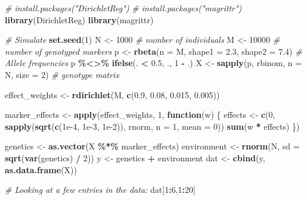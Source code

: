 \documentclass[
]{article}
\newenvironment{Shaded}{\begin{snugshade}}{\end{snugshade}}
\newcommand{\AttributeTok}[1]{\textcolor[rgb]{0.13,0.29,0.53}{#1}}
\newcommand{\CommentTok}[1]{\textcolor[rgb]{0.56,0.35,0.01}{\textit{#1}}}
\newcommand{\ControlFlowTok}[1]{\textcolor[rgb]{0.13,0.29,0.53}{\textbf{#1}}}
\newcommand{\DecValTok}[1]{\textcolor[rgb]{0.00,0.00,0.81}{#1}}
\newcommand{\FloatTok}[1]{\textcolor[rgb]{0.00,0.00,0.81}{#1}}
\newcommand{\FunctionTok}[1]{\textcolor[rgb]{0.13,0.29,0.53}{\textbf{#1}}}
\newcommand{\NormalTok}[1]{#1}
\newcommand{\OtherTok}[1]{\textcolor[rgb]{0.56,0.35,0.01}{#1}}
\newcommand{\SpecialCharTok}[1]{\textcolor[rgb]{0.81,0.36,0.00}{\textbf{#1}}}
\begin{document}
\begin{Shaded}
\begin{Highlighting}[]
\CommentTok{\# install.packages("DirichletReg")}
\CommentTok{\# install.packages("magrittr")}
\FunctionTok{library}\NormalTok{(DirichletReg)}
\FunctionTok{library}\NormalTok{(magrittr)}

\CommentTok{\# Simulate }
\FunctionTok{set.seed}\NormalTok{(}\DecValTok{1}\NormalTok{)}
\NormalTok{N }\OtherTok{\textless{}{-}} \DecValTok{1000} \CommentTok{\# number of individuals}
\NormalTok{M }\OtherTok{\textless{}{-}} \DecValTok{10000} \CommentTok{\# number of genotyped markers}
\NormalTok{p }\OtherTok{\textless{}{-}} \FunctionTok{rbeta}\NormalTok{(}\AttributeTok{n =}\NormalTok{ M, }\AttributeTok{shape1 =} \FloatTok{2.3}\NormalTok{, }\AttributeTok{shape2 =} \FloatTok{7.4}\NormalTok{) }\CommentTok{\# Allele frequencies}
\NormalTok{p }\SpecialCharTok{\%\textless{}\textgreater{}\%} \FunctionTok{ifelse}\NormalTok{(. }\SpecialCharTok{\textless{}} \FloatTok{0.5}\NormalTok{, ., }\DecValTok{1} \SpecialCharTok{{-}}\NormalTok{ .)}
\NormalTok{X }\OtherTok{\textless{}{-}} \FunctionTok{sapply}\NormalTok{(p, rbinom, }\AttributeTok{n =}\NormalTok{ N, }\AttributeTok{size =} \DecValTok{2}\NormalTok{) }\CommentTok{\# genotype matrix}

\NormalTok{effect\_weights }\OtherTok{\textless{}{-}} \FunctionTok{rdirichlet}\NormalTok{(M, }\FunctionTok{c}\NormalTok{(}\FloatTok{0.9}\NormalTok{, }\FloatTok{0.08}\NormalTok{, }\FloatTok{0.015}\NormalTok{, }\FloatTok{0.005}\NormalTok{))}

\NormalTok{marker\_effects }\OtherTok{\textless{}{-}} \FunctionTok{apply}\NormalTok{(effect\_weights, }\DecValTok{1}\NormalTok{, }\ControlFlowTok{function}\NormalTok{(w) \{}
\NormalTok{  effects }\OtherTok{\textless{}{-}} \FunctionTok{c}\NormalTok{(}\DecValTok{0}\NormalTok{, }\FunctionTok{sapply}\NormalTok{(}\FunctionTok{sqrt}\NormalTok{(}\FunctionTok{c}\NormalTok{(}\FloatTok{1e{-}4}\NormalTok{, }\FloatTok{1e{-}3}\NormalTok{, }\FloatTok{1e{-}2}\NormalTok{)), rnorm, }\AttributeTok{n =} \DecValTok{1}\NormalTok{, }\AttributeTok{mean =} \DecValTok{0}\NormalTok{))}
  \FunctionTok{sum}\NormalTok{(w }\SpecialCharTok{*}\NormalTok{ effects)}
\NormalTok{\})}

\NormalTok{genetics }\OtherTok{\textless{}{-}} \FunctionTok{as.vector}\NormalTok{(X }\SpecialCharTok{\%*\%}\NormalTok{ marker\_effects)}
\NormalTok{environment }\OtherTok{\textless{}{-}} \FunctionTok{rnorm}\NormalTok{(N, }\AttributeTok{sd =} \FunctionTok{sqrt}\NormalTok{(}\FunctionTok{var}\NormalTok{(genetics) }\SpecialCharTok{/} \DecValTok{2}\NormalTok{))}
\NormalTok{y }\OtherTok{\textless{}{-}}\NormalTok{ genetics }\SpecialCharTok{+}\NormalTok{ environment}
\NormalTok{dat }\OtherTok{\textless{}{-}} \FunctionTok{cbind}\NormalTok{(y, }\FunctionTok{as.data.frame}\NormalTok{(X))}

\CommentTok{\# Looking at a few entries in the data:}
\NormalTok{dat[}\DecValTok{1}\SpecialCharTok{:}\DecValTok{6}\NormalTok{,}\DecValTok{1}\SpecialCharTok{:}\DecValTok{20}\NormalTok{]}
\end{Highlighting}
\end{Shaded}
\end{document}

